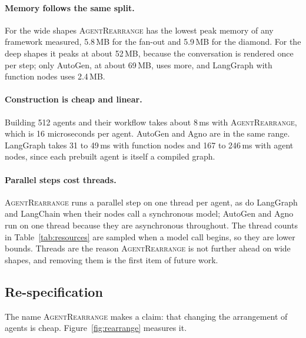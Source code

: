 \documentclass[11pt]{article}
\newcommand{\AR}{\textsc{AgentRearrange}}
\begin{document}
\paragraph{Memory follows the same split.}
For the wide shapes \AR{} has the lowest peak memory of any framework measured, 5.8\,MB for the fan-out and 5.9\,MB for the diamond. For the deep shapes it peaks at about 52\,MB, because the conversation is rendered once per step; only AutoGen, at about 69\,MB, uses more, and LangGraph with function nodes uses 2.4\,MB.

\paragraph{Construction is cheap and linear.}
Building 512 agents and their workflow takes about 8\,ms with \AR{}, which is 16 microseconds per agent. AutoGen and Agno are in the same range. LangGraph takes 31 to 49\,ms with function nodes and 167 to 246\,ms with agent nodes, since each prebuilt agent is itself a compiled graph.

\paragraph{Parallel steps cost threads.}
\AR{} runs a parallel step on one thread per agent, as do LangGraph and LangChain when their nodes call a synchronous model; AutoGen and Agno run on one thread because they are asynchronous throughout. The thread counts in Table~\ref{tab:resources} are sampled when a model call begins, so they are lower bounds. Threads are the reason \AR{} is not further ahead on wide shapes, and removing them is the first item of future work.

\subsection{Re-specification}

The name \AR{} makes a claim: that changing the arrangement of agents is cheap. Figure~\ref{fig:rearrange} measures it.
\end{document}
